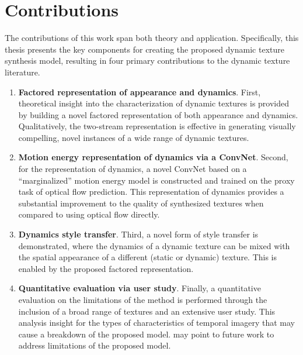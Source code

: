 \section{Contributions}

The contributions of this work span both theory and application. Specifically, this thesis presents the key components for creating the proposed dynamic texture synthesis model, resulting in four primary contributions to the dynamic texture literature.

\begin{enumerate}
	\item \textbf{Factored representation of appearance and dynamics}. First, theoretical insight into the characterization of dynamic textures is provided by building a novel factored representation of both appearance and dynamics. Qualitatively, the two-stream representation is effective in generating visually compelling, novel instances of a wide range of dynamic textures.
	\item \textbf{Motion energy representation of dynamics via a ConvNet}. Second, for the representation of dynamics, a novel ConvNet based on a ``marginalized'' motion energy model \cite{derpanis2010role,derpanis2012spacetime} is constructed and trained on the proxy task of optical flow prediction. This representation of dynamics provides a substantial improvement to the quality of synthesized textures when compared to using optical flow directly.
	\item \textbf{Dynamics style transfer}. Third, a novel form of style transfer is demonstrated, where the dynamics of a dynamic texture can be mixed with the spatial appearance of a different (static or dynamic) texture. This is enabled by the proposed factored representation.
	\item \textbf{Quantitative evaluation via user study}. Finally, a quantitative evaluation on the limitations of the method is performed through the inclusion of a broad range of textures and an extensive user study. This analysis  insight for the types of characteristics of temporal imagery that may cause a breakdown of the proposed model.  may point to future work to address limitations of the proposed model.
\end{enumerate}